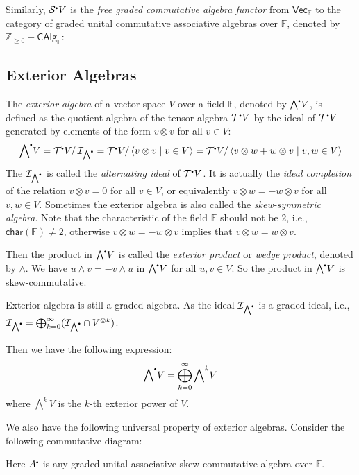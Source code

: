 \documentclass[
	11pt, %
	fleqn, %
	a4paper, %
]{LegrandOrangeBook}
\newcommand{\smallbullet}{\scalebox{0.5}{$\bullet$}}
\renewcommand{\bar}[1]{\overline{#1}} %
\newcommand{\quotient}[2]{#1/\, #2} %
\newcommand{\F}{\mathbb{F}} %
\newcommand{\Vect}{\boldsymbol{\mathsf{Vec}}} %
\newcommand{\T}{\mathcal{T}^{\smallbullet}} %
\newcommand{\chart}{\mathsf{char}} %
\newcommand{\Sym}{\mathcal{S}^{\smallbullet}} %
\newcommand{\Ext}{{\bigwedge}^{\smallbullet}} %
\newcommand{\ideal}{\mathcal{I}} %
\newcommand{\Z}{\mathbb{Z}} %
\newcommand{\CAlg}{\boldsymbol{\mathsf{CAlg}}} %
\begin{document}
Similarly, $\Sym V$ is the \emph{free graded commutative algebra functor} from $\Vect_{\F}$ to the category of graded unital commutative associative algebras over $\F$, denoted by $\Z_{\geq 0} - \CAlg_{\F}$:

\subsection{Exterior Algebras}

The \emph{exterior algebra} of a vector space $V$ over a field $\F$, denoted by $\Ext V$, is defined as the quotient algebra of the tensor algebra $\T V$ by the ideal of $\T V$ generated by elements of the form $v \otimes v$ for all $v \in V$:
\[
    \Ext V = \quotient{\T V}{\ideal_{\Ext}} = \quotient{\T V}{\langle v \otimes v \mid v \in V \rangle} = \quotient{\T V}{\langle v \otimes w + w \otimes v \mid v, w \in V \rangle}
\]
The $\ideal_{\Ext}$ is called the \emph{alternating ideal} of $\T V$. It is actually the \emph{ideal completion} of the relation $v \otimes v = 0$ for all $v \in V$, or equivalently $v \otimes w = - w \otimes v$ for all $v, w \in V$. Sometimes the exterior algebra is also called the \emph{skew-symmetric algebra}. Note that the characteristic of the field $\F$ should not be $2$, i.e., $\chart(\F) \neq 2$, otherwise $v \otimes w = - w \otimes v$ implies that $v \otimes w = w \otimes v$.

Then the product in $\Ext V$ is called the \emph{exterior product} or \emph{wedge product}, denoted by $\wedge$. We have $u \wedge v = - v \wedge u$ in $\Ext V$ for all $u, v \in V$. So the product in $\Ext V$ is skew-commutative.
\begin{remark}
    Exterior algebra is still a graded algebra. As the ideal $\ideal_{\Ext}$ is a graded ideal, i.e., $\ideal_{\Ext} = \bigoplus_{k = 0}^{\infty} (\ideal_{\Ext} \cap V^{\otimes k})$.
\end{remark}

Then we have the following expression:
\[
    \Ext V = \bigoplus_{k = 0}^{\infty} {\bigwedge}^k V
\]
where ${\bigwedge}^k V$ is the $k$-th exterior power of $V$.

We also have the following universal property of exterior algebras. Consider the following commutative diagram:
\begin{center}
\end{center}
Here $A^{\smallbullet}$ is any graded unital associative skew-commutative algebra over $\F$.
\end{document}

